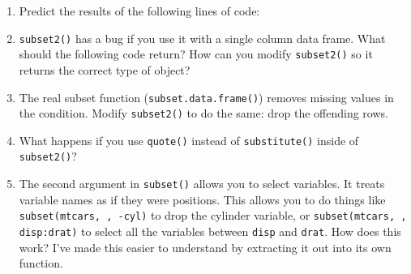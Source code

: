 \begin{enumerate}
\def\labelenumi{\arabic{enumi}.}
\item
  Predict the results of the following lines of code:

\begin{Shaded}
\begin{Highlighting}[]
\NormalTok{(}\NormalTok{(}\NormalTok{(}\NormalTok{(}\NormalTok{(}\NormalTok{(} \NormalTok{+}\StringTok{ }\NormalTok{))))))}
\NormalTok{(}\NormalTok{(}\NormalTok{(}\NormalTok{(}\NormalTok{(}\NormalTok{(}\NormalTok{(} \NormalTok{+}\StringTok{ }\NormalTok{)))))))}
\NormalTok{(}\NormalTok{(}\NormalTok{(}\NormalTok{(}\NormalTok{(}\NormalTok{(}\NormalTok{(} \NormalTok{+}\StringTok{ }\NormalTok{)))))))}
\end{Highlighting}
\end{Shaded}
\item
  \texttt{subset2()} has a bug if you use it with a single column data
  frame. What should the following code return? How can you modify
  \texttt{subset2()} so it returns the correct type of object?

\begin{Shaded}
\begin{Highlighting}[]
\StringTok{ }\NormalTok{(} \NormalTok{:}\NormalTok{)}
\StringTok{ }\NormalTok{)}
\end{Highlighting}
\end{Shaded}
\item
  The real subset function (\texttt{subset.data.frame()}) removes
  missing values in the condition. Modify \texttt{subset2()} to do the
  same: drop the offending rows.
\item
  What happens if you use \texttt{quote()} instead of
  \texttt{substitute()} inside of \texttt{subset2()}?
\item
  The second argument in \texttt{subset()} allows you to select
  variables. It treats variable names as if they were positions. This
  allows you to do things like \texttt{subset(mtcars, , -cyl)} to drop
  the cylinder variable, or \texttt{subset(mtcars, , disp:drat)} to
  select all the variables between \texttt{disp} and \texttt{drat}. How
  does this work? I've made this easier to understand by extracting it
  out into its own function.


\end{enumerate}
